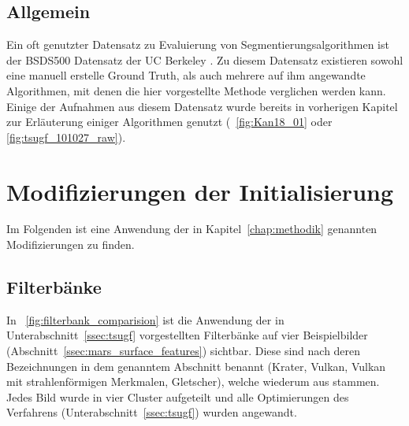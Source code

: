\subsection{Allgemein}
\label{ssec:bsds500}
Ein oft genutzter Datensatz zu Evaluierung von Segmentierungsalgorithmen ist der BSDS500 Datensatz der UC Berkeley \cite{bsd500}. Zu diesem Datensatz existieren sowohl eine manuell erstelle Ground Truth, als auch mehrere auf ihm angewandte Algorithmen, mit denen die hier vorgestellte Methode verglichen werden kann.
Einige der Aufnahmen aus diesem Datensatz wurde bereits in vorherigen Kapitel zur Erläuterung einiger Algorithmen genutzt (\vgl \bspw \figurename~\ref{fig:Kan18_01} oder \ref{fig:tsugf_101027_raw}).

\section{Modifizierungen der Initialisierung}
\label{sec:modifications}

Im Folgenden ist eine Anwendung der in Kapitel~\ref{chap:methodik} genannten Modifizierungen zu finden.

\subsection{Filterbänke}
\label{ssec:exp_filterbanks}

In \figurename~\ref{fig:filterbank_comparision} ist die Anwendung der in Unterabschnitt~\ref{ssec:tsugf} vorgestellten Filterbänke auf vier Beispielbilder (\vgl Abschnitt~\ref{ssec:mars_surface_features}) sichtbar. Diese sind nach deren Bezeichnungen in dem genanntem Abschnitt benannt (Krater, Vulkan, Vulkan mit strahlenförmigen Merkmalen, Gletscher), welche wiederum aus \cite[Kap.~7]{greeley_13} stammen. Jedes Bild wurde in vier Cluster aufgeteilt und alle Optimierungen des Verfahrens (\vgl Unterabschnitt~\ref{ssec:tsugf}) wurden angewandt.

